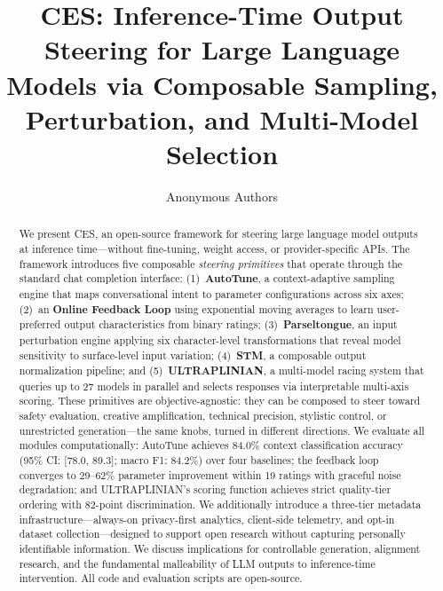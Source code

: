 \documentclass[11pt]{article}
\title{CES: Inference-Time Output Steering for Large Language Models via Composable Sampling, Perturbation, and Multi-Model Selection}
\author{
  Anonymous Authors
}
\begin{document}
\maketitle

\begin{abstract}
We present \textsc{CES}, an open-source framework for steering large language model outputs at inference time---without fine-tuning, weight access, or provider-specific APIs. The framework introduces five composable \emph{steering primitives} that operate through the standard chat completion interface: (1)~\textbf{AutoTune}, a context-adaptive sampling engine that maps conversational intent to parameter configurations across six axes; (2)~an \textbf{Online Feedback Loop} using exponential moving averages to learn user-preferred output characteristics from binary ratings; (3)~\textbf{Parseltongue}, an input perturbation engine applying six character-level transformations that reveal model sensitivity to surface-level input variation; (4)~\textbf{STM}, a composable output normalization pipeline; and (5)~\textbf{ULTRAPLINIAN}, a multi-model racing system that queries up to 27 models in parallel and selects responses via interpretable multi-axis scoring. These primitives are objective-agnostic: they can be composed to steer toward safety evaluation, creative amplification, technical precision, stylistic control, or unrestricted generation---the same knobs, turned in different directions. We evaluate all modules computationally: AutoTune achieves 84.0\% context classification accuracy (95\% CI: [78.0, 89.3]; macro F1: 84.2\%) over four baselines; the feedback loop converges to 29--62\% parameter improvement within 19 ratings with graceful noise degradation; and ULTRAPLINIAN's scoring function achieves strict quality-tier ordering with 82-point discrimination. We additionally introduce a three-tier metadata infrastructure---always-on privacy-first analytics, client-side telemetry, and opt-in dataset collection---designed to support open research without capturing personally identifiable information. We discuss implications for controllable generation, alignment research, and the fundamental malleability of LLM outputs to inference-time intervention. All code and evaluation scripts are open-source.
\end{abstract}

\end{document}
